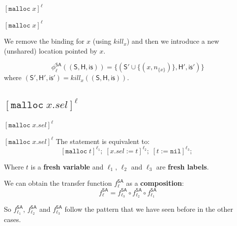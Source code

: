 \documentclass[xcolor=svgnames,11pt]{beamer}
\begin{document}
\begin{frame}{}
\begin{center}
\begin{huge}
\textcolor{bl}{$[\mathtt{malloc}\;x]^\ell$}
\end{huge}
\end{center}
\end{frame}


\begin{frame}{$[\mathtt{malloc}\;x]^\ell$}

We remove the binding for $x$ (using $kill_x$) and then we introduce a new (unshared) location pointed by $x$.

\medskip
\pause

$${\phi}_\ell^{\mathsf{SA}}\mathsf{((S,H,is))} = \{ (\mathsf{S'} \cup \{(x, n_{\{x\}})\}, \mathsf{H'}, \mathsf{is'})\} $$
\medskip
where $\mathsf{ (S',H',is') } = kill_{x}(\mathsf{ (S,H,is) })$.


\end{frame}

\subsection{$[\mathtt{malloc}\;x.sel]^\ell$}

\begin{frame}{}
\begin{center}
\begin{huge}
\textcolor{bl}{$[\mathtt{malloc}\;x.sel]^\ell$}
\end{huge}
\end{center}
\end{frame}



\begin{frame}{$[\mathtt{malloc}\;x.sel]^\ell$}
The statement is equivalent to:
$$[\mathtt{malloc}\;t]^{\ell_1};\; [x.sel:=t]^{\ell_2};\; [t:=\mathtt{nil}]^{\ell_3};\; $$

Where $t$ is a \textbf{fresh variable} and $\ell_1$, $\ell_2$ and $\ell_3$ are \textbf{fresh labels}.\\

\medskip
\pause

We can obtain the transfer function $f_\ell^{\textsf{SA}}$ as a \textbf{composition}:
$$f_\ell^{\textsf{SA}} = f_{\ell_3}^{\textsf{SA}} \circ f_{\ell_2}^{\textsf{SA}} \circ f_{\ell_1}^{\textsf{SA}}$$

So $f_{\ell_1}^{\textsf{SA}}$, $f_{\ell_2}^{\textsf{SA}}$ and $f_{\ell_3}^{\textsf{SA}}$ follow the pattern that we have seen before in the other cases.
\end{frame}
\end{document}
